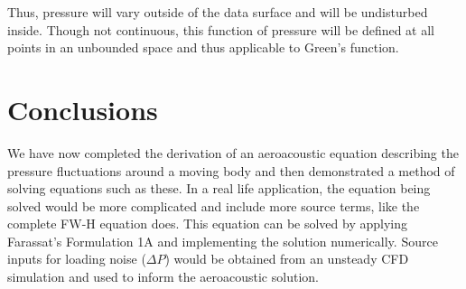 \documentclass[]{aiaa-tc}%
\begin{document}
\noindent Thus, pressure will vary outside of the data surface and will be undisturbed inside. Though not continuous, this function of pressure will be defined at all points in an unbounded space and thus applicable to Green's function.






\section{Conclusions}

We have now completed the derivation of an aeroacoustic equation describing the pressure fluctuations around a moving body and then demonstrated a method of solving equations such as these.  In a real life application, the equation being solved would be more complicated and include more source terms, like the complete FW-H equation does.  This equation can be solved by applying Farassat's Formulation 1A and implementing the solution numerically.  Source inputs for loading noise ($\Delta P$) would be obtained from an unsteady CFD simulation and used to inform the aeroacoustic solution.
\end{document}
